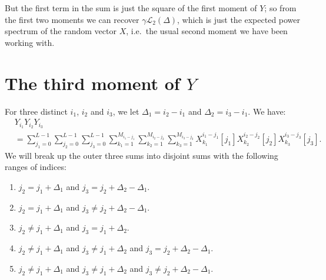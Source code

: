 \documentclass{article}
\theoremstyle{thm}
\theoremstyle{definition}
\newcommand{\1}{\mathbf{1}}
\renewcommand{\L}{\mathcal{L}}
\begin{document}
But the first term in the sum is just the square of the first moment of $Y$; so from the first two moments we can recover $\gamma \L_2(\Delta)$, which is just the expected power spectrum of the random vector $X$, i.e.\ the usual second moment we have been working with.


%


\section{The third moment of $Y$}

For three distinct $i_1$, $i_2$ and $i_3$, we let $\Delta_1 = i_2 - i_1$ and $\Delta_2 = i_3 - i_1$. We have:
%
\begin{align}
%
&Y_{i_1} Y_{i_2} Y_{i_3}
    \nonumber \\
&= \sum_{j_1=0}^{L-1} \sum_{j_2=0}^{L-1} \sum_{j_3=0}^{L-1} 
    \sum_{k_1=1}^{M_{i_1-j_1}}\sum_{k_2=1}^{M_{i_2-j_2}} \sum_{k_3=1}^{M_{i_3-j_3}}
        X_{k_1}^{i_1-j_1}[j_1] X_{k_2}^{i_2 - j_2}[j_2] X_{k_3}^{i_3 - j_3}[j_3].
\end{align}
%
We will break up the outer three sums into disjoint sums with the following ranges of indices:
%
\begin{enumerate}

\item \label{case1}
$j_2 = j_1 + \Delta_1$ and $j_3 = j_2 + \Delta_2 - \Delta_1$.

\item \label{case2}
$j_2 = j_1 + \Delta_1$ and $j_3 \ne j_2 + \Delta_2 - \Delta_1$.

\item \label{case3}
$j_2 \ne j_1 + \Delta_1$ and $j_3 = j_1 + \Delta_2$.

\item \label{case4}
$j_2 \ne j_1 + \Delta_1$ and $j_3 \ne j_1 + \Delta_2$ and $j_3 = j_2 + \Delta_2 - \Delta_1$.

\item \label{case5}
$j_2 \ne j_1 + \Delta_1$ and $j_3 \ne j_1 + \Delta_2$ and $j_3 \ne j_2 + \Delta_2 - \Delta_1$.

\end{enumerate}
\end{document}
